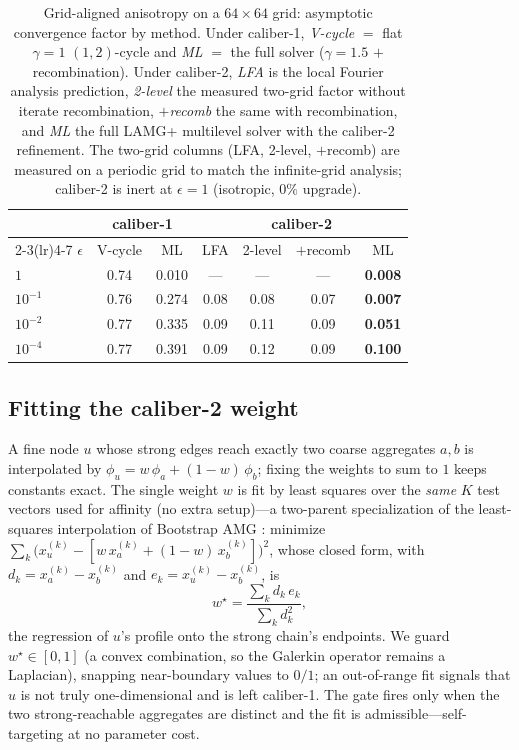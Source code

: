 \documentclass{siamart220329}
\begin{document}
\begin{table}[h]\centering\footnotesize\setlength{\tabcolsep}{4pt}
\caption{Grid-aligned anisotropy on a $64\times64$ grid: asymptotic convergence factor by method.
Under caliber-1, \emph{V-cycle} $=$ flat $\gamma{=}1$ $(1,2)$-cycle and \emph{ML} $=$ the full solver
($\gamma{=}1.5$ $+$ recombination). Under caliber-2, \emph{LFA} is the local Fourier analysis
prediction, \emph{2-level} the measured two-grid factor without iterate recombination, \emph{$+$recomb}
the same with recombination, and \emph{ML} the full LAMG+ multilevel solver with the caliber-2
refinement. The two-grid columns (LFA, 2-level, $+$recomb) are measured on a periodic grid to match the
infinite-grid analysis; caliber-2 is inert at $\epsilon{=}1$ (isotropic, $0\%$ upgrade).}\label{tab:aniso}
\begin{tabular}{l cc cccc}
\toprule
 & \multicolumn{2}{c}{caliber-1} & \multicolumn{4}{c}{caliber-2}\\
\cmidrule(lr){2-3}\cmidrule(lr){4-7}
$\epsilon$ & V-cycle & ML & LFA & 2-level & $+$recomb & ML\\
\midrule
$1$       & 0.74 & 0.010 & ---  & ---  & ---  & \textbf{0.008}\\
$10^{-1}$ & 0.76 & 0.274 & 0.08 & 0.08 & 0.07 & \textbf{0.007}\\
$10^{-2}$ & 0.77 & 0.335 & 0.09 & 0.11 & 0.09 & \textbf{0.051}\\
$10^{-4}$ & 0.77 & 0.391 & 0.09 & 0.12 & 0.09 & \textbf{0.100}\\
\bottomrule
\end{tabular}
\end{table}

\subsection{Fitting the caliber-2 weight}
A fine node $u$ whose strong edges reach exactly two
coarse aggregates $a,b$ is interpolated by $\phi_u=w\,\phi_a+(1-w)\,\phi_b$; fixing the weights
to sum to $1$ keeps constants exact. The single weight $w$ is fit by least squares over the
\emph{same} $K$ test vectors used for affinity (no extra setup)---a two-parent specialization of the
least-squares interpolation of Bootstrap AMG \cite{brandt-bootstrap}: minimize
$\sum_k \big(x^{(k)}_u-[w\,x^{(k)}_a+(1-w)\,x^{(k)}_b]\big)^2$, whose closed form, with
$d_k=x^{(k)}_a-x^{(k)}_b$ and $e_k=x^{(k)}_u-x^{(k)}_b$, is
\begin{equation}\label{eq:wfit}
w^\star=\frac{\sum_k d_k\,e_k}{\sum_k d_k^2},
\end{equation}
the regression of $u$'s profile onto the strong chain's endpoints. We guard $w^\star\in[0,1]$
(a convex combination, so the Galerkin operator remains a Laplacian), snapping
near-boundary values to $0/1$; an out-of-range fit signals that $u$ is not truly one-dimensional
and is left caliber-1. The gate fires only when the two strong-reachable aggregates are distinct
and the fit is admissible---self-targeting at no parameter cost.
\end{document}
